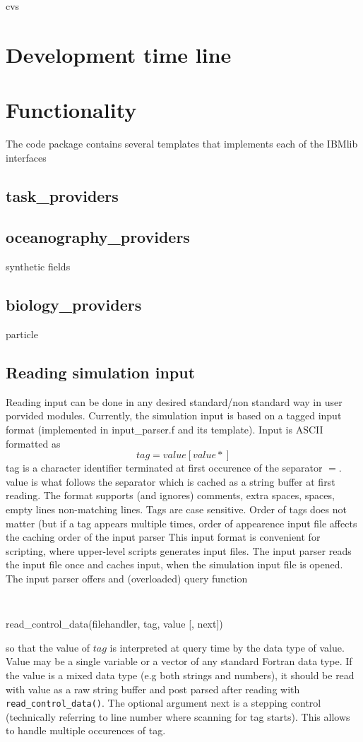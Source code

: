 cvs \newline




\chapter{Development time line}


\chapter{Functionality}

The code package contains several templates that 
implements each of the IBMlib interfaces
\section{task\_providers}
\section{oceanography\_providers}
synthetic fields
\section{biology\_providers}
particle

\section{Reading simulation input}
Reading input can be done in any desired standard/non standard way
in user porvided modules. Currently, the simulation input is based on
a tagged input format (implemented in input\_parser.f and its 
template). Input is ASCII formatted as  
\begin{equation}
tag = value [value*] \nonumber
\end{equation}
tag is a character identifier terminated at first occurence of 
the separator $=$. value is what follows the separator which
is cached as a string buffer at first reading. 
The format supports (and ignores) comments, extra spaces, spaces, 
empty lines non-matching lines. Tags are case sensitive.
Order of tags does not matter (but if a tag appears multiple times,
order of appearence input file affects the caching order of the input parser
This input format is convenient for scripting, where upper-level  
scripts generates input files.
The input parser reads the input file once and caches input, when 
the simulation input file is opened. 
The input parser offers and (overloaded) query function
\begin{itemize}
{\tt 
\item read\_control\_data(filehandler, tag, value [, next]) 
}
\end{itemize}
so that the value of $tag$ is interpreted at query time by the
data type of value. Value may be a single variable or a vector
of any standard Fortran data type. If the value is a mixed
data type (e.g both strings and numbers), it should be read
with value as a raw string buffer and post parsed after reading
with {\tt read\_control\_data()}. The optional argument next
is a stepping control (technically referring to line number where scanning for 
tag starts). This allows to handle multiple occurences of tag.



